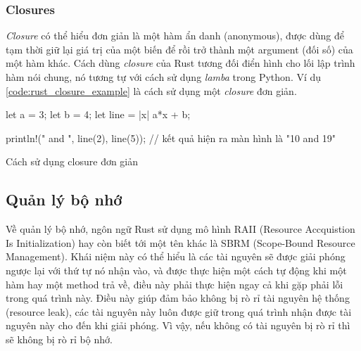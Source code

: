 \subsubsection{Closures}
\emph{Closure} có thể hiểu đơn giản là một hàm ẩn danh (anonymous), được dùng để tạm thời giữ lại giá trị của một biến để rồi trở thành một argument (đối số) của một hàm khác.
Cách dùng \emph{closure} của Rust tương đối điển hình cho lối lập trình hàm nói chung, nó tương tự với cách sử dụng \emph{lamba} trong Python.
Ví dụ \ref{code:rust_closure_example} là cách sử dụng một \emph{closure} đơn giản.
\begin{listing}[H]
\begin{rustcode}
let a = 3;
let b = 4;
let line = |x| a*x + b;

println!("{} and {}", line(2), line(5)); // kết quả hiện ra màn hình là "10 and 19"
\end{rustcode}
\caption{Cách sử dụng closure đơn giản}
\label{code:rust_closure_example}
\end{listing}

\subsection{Quản lý bộ nhớ}
Về quản lý bộ nhớ, ngôn ngữ Rust sử dụng mô hình RAII (Resource Accquistion Is Initialization) hay còn biết tới một tên khác là SBRM (Scope-Bound Resource Management).
Khái niệm này có thể hiểu là các tài nguyên sẽ được giải phóng ngược lại với thứ tự nó nhận vào, và được thực hiện một cách tự động khi một hàm hay một method trả về, điều này phải thực hiện ngay cả khi gặp phải lỗi trong quá trình này.
Điều này giúp đảm bảo không bị rò rỉ tài nguyên hệ thống (resource leak), các tài nguyên này luôn được giữ trong quá trình nhận được tài nguyên này cho đến khi giải phóng. Vì vậy, nếu không có tài nguyên bị rò rỉ thì sẽ không bị rò rỉ bộ nhớ.

